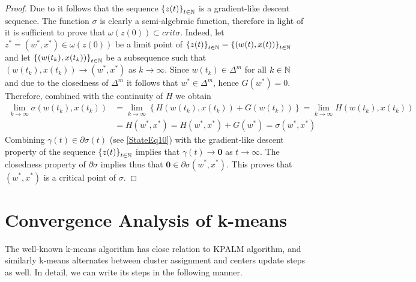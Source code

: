 \begin{proof}
Due to  it follows that the sequence $\left\lbrace z(t) \right\rbrace_{t \in \mathbb{N}}$ is a gradient-like descent sequence. The function $\sigma$ is clearly a semi-algebraic function, therefore in light of  it is sufficient to prove that $\omega(z(0)) \subset crit\sigma$. 
Indeed, let $z^*=\left( w^*,x^* \right) \in \omega(z(0))$ be a limit point of  $\left\lbrace z(t) \right\rbrace_{t \in \mathbb{N}} = \left\lbrace \left( w(t),x(t) \right) \right\rbrace_{t \in \mathbb{N}}$ and let $\left\lbrace \left( w(t_k),x(t_k) \right) \right\rbrace_{t \in \mathbb{N}}$ be a subsequence such that $\left( w(t_k),x(t_k) \right) \rightarrow \left( w^*,x^* \right)$ as $k \rightarrow \infty$. Since $w(t_k) \in \Delta^m$ for all $k \in \mathbb{N}$ and due to the closedness of $\Delta^m$ it follows that $w^* \in \Delta^m$, hence $G(w^*)=0$. Therefore, combined with the continuity of $H$ we obtain
\begin{align*}
\lim\limits_{k \rightarrow \infty} \sigma\left( w(t_k),x(t_k) \right) &= \lim\limits_{k \rightarrow \infty} \left\lbrace H\left(w(t_k),x(t_k)\right) + G\left(w(t_k)\right) \right\rbrace = \lim\limits_{k \rightarrow \infty} H\left(w(t_k),x(t_k)\right) \\
&= H\left(w^*,x^* \right) = H\left(w^*,x^* \right) + G(w^*) = \sigma\left(w^*,x^*\right)
\end{align*}
Combining $\gamma(t) \in \partial \sigma(t)$ (see \ref{StateEq10}) with the gradient-like descent property of the sequence $\left\lbrace z(t) \right\rbrace_{t \in \mathbb{N}}$ implies that $\gamma(t) \rightarrow \mathbf{0}$ as $t \rightarrow \infty$. The closedness property of $\partial\sigma$ implies thus that $\mathbf{0} \in \partial \sigma \left(w^*,x^*\right)$. This proves that $\left(w^*,x^*\right)$ is a critical point of $\sigma$.
\end{proof}

\section{Convergence Analysis of k-means}

The well-known k-means algorithm has close relation to KPALM algorithm, and similarly k-means alternates between cluster assignment and centers update steps as well. In detail, we can write its steps in the following manner.

